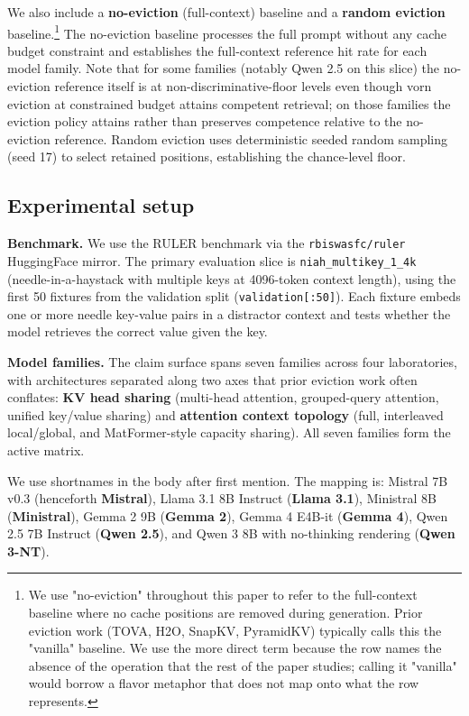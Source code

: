 \documentclass[10pt]{article}
\begin{document}
We also include a \textbf{no-eviction} (full-context) baseline and a
\textbf{random eviction} baseline.\footnote{We use "no-eviction"
 throughout this paper to refer to the full-context baseline where no
 cache positions are removed during generation. Prior eviction work
 (TOVA, H2O, SnapKV, PyramidKV) typically calls this the "vanilla"
 baseline. We use the more direct term because the row names the
 absence of the operation that the rest of the paper studies; calling
 it "vanilla" would borrow a flavor metaphor that does not map onto
 what the row represents.} The no-eviction baseline processes the full
prompt without any cache budget constraint and establishes the
full-context reference hit rate for each model family. Note that for
some families (notably Qwen 2.5 on this slice) the
no-eviction reference itself is at non-discriminative-floor levels even
though vorn eviction at constrained budget attains
competent retrieval; on those families the eviction policy attains
rather than preserves competence relative to the no-eviction reference.
Random eviction uses deterministic seeded random sampling (seed 17) to
select retained positions, establishing the chance-level floor.

\subsection{Experimental setup}\label{35-experimental-setup}

\textbf{Benchmark.} We use the RULER benchmark \citep{hsieh2024ruler} via
the \texttt{rbiswasfc/ruler} HuggingFace mirror. The primary evaluation
slice is \texttt{niah\_multikey\_1\_4k} (needle-in-a-haystack with
multiple keys at 4096-token context length), using the first 50 fixtures
from the validation split (\texttt{validation{[}:50{]}}). Each fixture
embeds one or more needle key-value pairs in a distractor context and
tests whether the model retrieves the correct value given the key.

\textbf{Model families.} The claim surface spans seven families across
four laboratories, with architectures separated along two axes that
prior eviction work often conflates: \textbf{KV head sharing}
(multi-head attention, grouped-query attention, unified key/value
sharing) and \textbf{attention context topology} (full, interleaved
local/global, and MatFormer-style capacity sharing). All seven families
form the active matrix.

We use shortnames in the body after first mention. The mapping is:
Mistral 7B v0.3 (henceforth \textbf{Mistral}), Llama 3.1 8B Instruct
(\textbf{Llama 3.1}), Ministral 8B (\textbf{Ministral}), Gemma 2 9B
(\textbf{Gemma 2}), Gemma 4 E4B-it (\textbf{Gemma 4}), Qwen 2.5 7B
Instruct (\textbf{Qwen 2.5}), and Qwen 3 8B with no-thinking rendering
(\textbf{Qwen 3-NT}).
\end{document}

